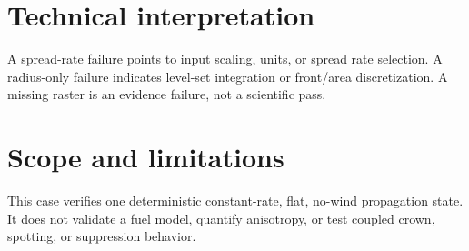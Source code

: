 \section{Technical interpretation}

A spread-rate failure points to input scaling, units, or spread rate selection. A radius-only failure indicates level-set integration or front/area discretization. A missing raster is an evidence failure, not a scientific pass.

\section{Scope and limitations}

This case verifies one deterministic constant-rate, flat, no-wind propagation state. It does not validate a fuel model, quantify anisotropy, or test coupled crown, spotting, or suppression behavior.

